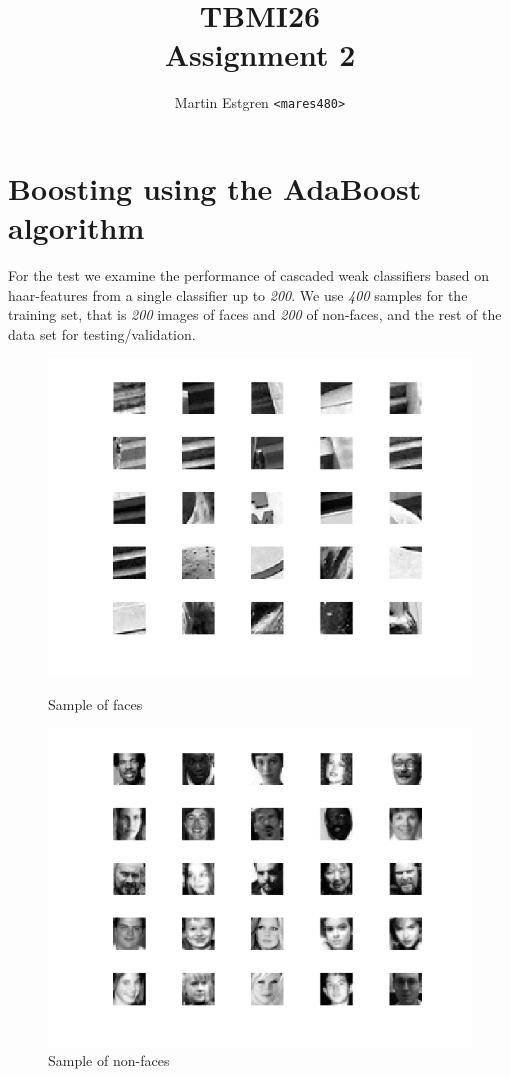 \documentclass[a4paper,12pt]{article}
\title{TBMI26  \\
       Assignment 2}
\author{Martin Estgren \texttt{<mares480>}}
\begin{document}
    \maketitle %

\section{Boosting using the AdaBoost algorithm}

For the test we examine the performance of cascaded weak classifiers based on haar-features from a single classifier up to \textit{200}. We use \textit{400} samples for the training set, that is \textit{200} images of faces and \textit{200} of non-faces, and the rest of the data set for testing/validation.

\begin{figure}[H]
\centering
  \begin{minipage}[]{0.8\textwidth}
  \includegraphics[width=\textwidth]{figures/sample_of_non_faces.png}
  \caption{Sample of faces}\label{fig:sample_data_set}

  \end{minipage}
    \begin{minipage}[]{0.8\textwidth}
  \includegraphics[width=\textwidth]{figures/sample_of_faces.png}
  \caption{Sample of non-faces}\label{fig:sample_data_set}


\end{minipage}
\end{figure}
\end{document}
